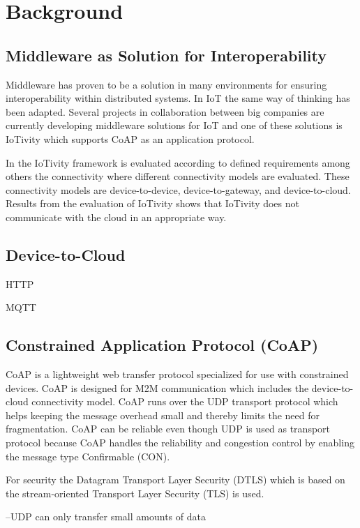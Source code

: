 \section{Background}




\subsection{Middleware as Solution for Interoperability}
Middleware has proven to be a solution in many environments for ensuring interoperability within distributed systems. In IoT the same way of thinking has been adapted. 
Several projects in collaboration between big companies are currently developing  middleware solutions for IoT and one of these solutions is IoTivity which supports CoAP as an application protocol.
 
In \cite{interoperabilityChallenge} the IoTivity framework is evaluated according to defined requirements among others the connectivity where different connectivity models are evaluated. These connectivity models are device-to-device, device-to-gateway, and device-to-cloud. Results from the evaluation of IoTivity shows that IoTivity does not communicate with the cloud in an appropriate way. 

\subsection{Device-to-Cloud}
HTTP

MQTT



\subsection{Constrained Application Protocol (CoAP)}
CoAP is a lightweight web transfer protocol specialized for use with constrained devices. CoAP is designed for M2M communication which includes the device-to-cloud connectivity model.
CoAP runs over the UDP transport protocol which helps keeping the message overhead small and thereby limits the need for fragmentation.
CoAP can be reliable even though UDP is used as transport protocol because CoAP handles the reliability and congestion control by enabling the message type Confirmable (CON).
 
For security the Datagram Transport Layer Security (DTLS) which is based on the stream-oriented Transport Layer Security (TLS) is used.
 
--UDP can only transfer small amounts of data

